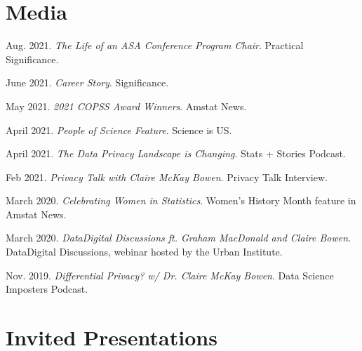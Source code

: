\documentclass[11pt, letterpaper, roman]{moderncv} %
\begin{document}
\section{Media}
\begin{etaremune}[topsep=0pt, itemsep=6pt, partopsep=0pt, parsep=0pt]
    \item Aug. 2021. \textit{The Life of an ASA Conference Program Chair}. Practical Significance.

    \item June 2021. \textit{Career Story}. Significance.
    
    \item May 2021. \textit{2021 COPSS Award Winners}. Amstat News.
    
    \item April 2021. \textit{People of Science Feature}. Science is US.
    
    \item April 2021. \textit{The Data Privacy Landscape is Changing}. Stats + Stories Podcast.
    
    \item Feb 2021. \textit{Privacy Talk with Claire McKay Bowen}. Privacy Talk Interview.

    \item March 2020. \textit{Celebrating Women in Statistics}. Women's History Month feature in Amstat News.

    \item March 2020. \textit{Data\@Urban Digital Discussions ft. Graham MacDonald and Claire Bowen}. Data\@Urban Digital Discussions, webinar hosted by the Urban Institute.
    
    \item Nov. 2019. \textit{Differential Privacy? w/ Dr. Claire McKay Bowen}. Data Science Imposters Podcast.
\end{etaremune}


\section{Invited Presentations}
\end{document}
